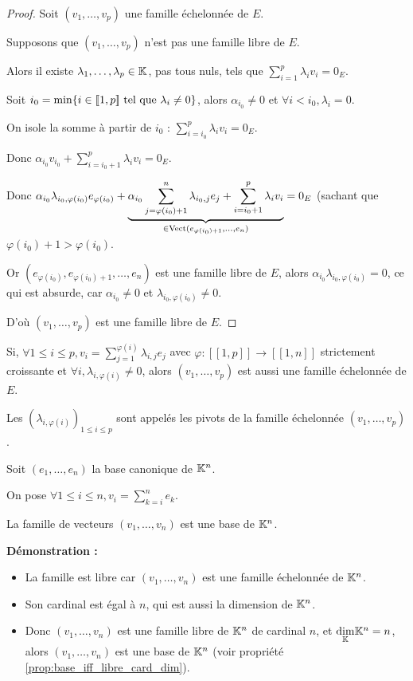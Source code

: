 \documentclass[12pt, a4paper]{report}
\begin{document}
\begin{proof}
    Soit $(v_1,\dots,v_p)$ une famille échelonnée de $E$.

    Supposons que $(v_1,\dots,v_p)$ n'est pas une famille libre de $E$.
    
    Alors il existe $\lambda_1,\dots,\lambda_p \in \mathbb{K}$, pas tous nuls, tels que $\sum_{i=1}^p \lambda_i v_i = 0_E$.

    Soit $i_0 = \min\{i \in [\![1,p]\!] \text{ tel que } \lambda_i \ne 0\}$, alors $\alpha_{i_0} \ne 0$ et $\forall i < i_0, \lambda_i = 0$.

    On isole la somme à partir de $i_0$ : $\sum_{i=i_0}^p \lambda_i v_i = 0_E$.

    Donc $\alpha_{i_0} v_{i_0} + \sum_{i=i_0+1}^p \lambda_i v_i = 0_E$.

    Donc $\alpha_{i_0} \lambda_{i_0,\varphi(i_0)} e_{\varphi(i_0)} + \underbrace{\alpha_{i_0} \sum_{j=\varphi(i_0)+1}^n \lambda_{i_0,j} e_j + \sum_{i=i_0+1}^p \lambda_i v_i}_{\in \mathrm{Vect}(e_{\varphi(i_0)+1},\dots,e_n)} = 0_E$ (sachant que $\varphi(i_0) + 1 > \varphi(i_0)$.

    Or $(e_{\varphi(i_0)}, e_{\varphi(i_0)+1},\dots,e_n)$ est une famille libre de $E$, alors $\alpha_{i_0} \lambda_{i_0,\varphi(i_0)} = 0$, ce qui est absurde, car $\alpha_{i_0} \ne 0$ et $\lambda_{i_0,\varphi(i_0)} \ne 0$.

    D'où $(v_1,\dots,v_p)$ est une famille libre de $E$.
\end{proof}

\begin{remark}[Ordre]
    Si, $\forall 1 \le i \le p, v_i = \sum_{j=1}^{\varphi(i)} \lambda_{i,j} e_j$ avec $\varphi : [\![1,p]\!] \to [\![1,n]\!]$ strictement croissante et $\forall i, \lambda_{i,\varphi(i)} \ne 0$, alors $(v_1,\dots,v_p)$ est aussi une famille échelonnée de $E$.

    Les $(\lambda_{i,\varphi(i)})_{1 \le i \le p}$ sont appelés les pivots de la famille échelonnée $(v_1,\dots,v_p)$.
\end{remark}

\begin{example}
    Soit $(e_1,\dots,e_n)$ la base canonique de $\mathbb{K}^n$.

    On pose $\forall 1 \le i \le n, v_i = \sum_{k=i}^{n}e_k$.

    La famille de vecteurs $(v_1,\dots,v_n)$ est une base de $\mathbb{K}^n$.

    \textbf{Démonstration :}

    \begin{itemize}
        \item La famille est libre car $(v_1,\dots,v_n)$ est une famille échelonnée de $\mathbb{K}^n$.
        \item Son cardinal est égal à $n$, qui est aussi la dimension de $\mathbb{K}^n$.
        \item Donc $(v_1,\dots,v_n)$ est une famille libre de $\mathbb{K}^n$ de cardinal $n$, et $\underset{\mathbb{K}}\dim \mathbb{K}^n = n$, alors $(v_1,\dots,v_n)$ est une base de $\mathbb{K}^n$ (voir propriété \ref{prop:base_iff_libre_card_dim}).
    \end{itemize}
\end{example}
\end{document}
